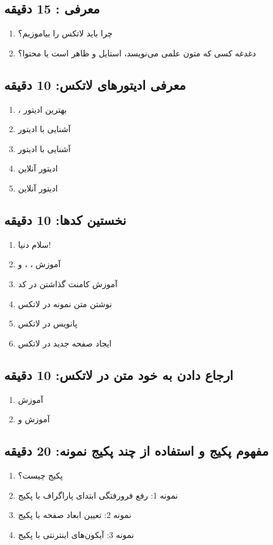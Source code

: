 \documentclass{article}
\begin{document}
\subsection*{معرفی \lr{\LaTeX}: 15 دقیقه}
\begin{enumerate}
\item چرا باید لاتکس را بیاموزیم؟
\item دغدغه کسی که متون علمی می‌نویسد، استایل و ظاهر است یا محتوا؟
\end{enumerate}
\subsection*{معرفی ادیتورهای لاتکس: 10 دقیقه}
\begin{enumerate}
\item {}، بهترین ادیتور
\item آشنایی با ادیتور 
\item آشنایی با ادیتور 
\item ادیتور آنلاین 
\item ادیتور آنلاین 
\end{enumerate}
\subsection*{نخستین کدها: 10 دقیقه}
\begin{enumerate}
\item سلام دنیا!
\item آموزش ، ،  و 
\item آموزش کامنت گذاشتن در کد
\item نوشتن متن نمونه در لاتکس
\item پانویس در لاتکس
\item ایجاد صفحه جدید در لاتکس
\end{enumerate}
\subsection*{ارجاع دادن به خود متن در لاتکس: 10 دقیقه}
\begin{enumerate}
\item آموزش 
\item آموزش  و 
\end{enumerate}
\subsection*{مفهوم پکیج و استفاده از چند پکیج نمونه: 20 دقیقه}
\begin{enumerate}
\item پکیج چیست؟
\item نمونه 1: رفع فرورفتگی ابتدای پاراگراف با پکیج 
\item نمونه 2: تعیین ابعاد صفحه با پکیج 
\item نمونه 3: آیکون‌های اینترنتی با پکیج 
\end{enumerate}
\end{document}
